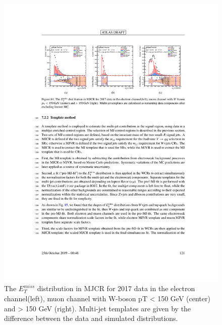 \begin{figure}[h!]
  \centering
  \includegraphics[width=\hsize]{figures/Analysis/multijet/multijet_met.pdf}
      \caption{The $E_{T}^{miss}$ distribution in MJCR for 2017 data in the electron channel(left), muon channel with W-boson pT < 150 GeV (center) and > 150 GeV (right). Multi-jet templates are given by the difference between the data and simulated distributions.} 
  \label{fig:multijet_met}
\end{figure} 
\FloatBarrier



